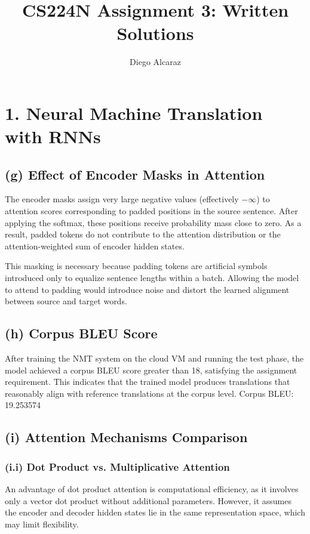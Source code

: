 \documentclass[11pt]{article}
\title{CS224N Assignment 3: Written Solutions}
\author{Diego Alcaraz}
\date{}
\begin{document}
\maketitle

\section*{1. Neural Machine Translation with RNNs}

\subsection*{(g) Effect of Encoder Masks in Attention}

The encoder masks assign very large negative values (effectively $-\infty$) to attention scores corresponding to padded positions in the source sentence. After applying the softmax, these positions receive probability mass close to zero. As a result, padded tokens do not contribute to the attention distribution or the attention-weighted sum of encoder hidden states.

This masking is necessary because padding tokens are artificial symbols introduced only to equalize sentence lengths within a batch. Allowing the model to attend to padding would introduce noise and distort the learned alignment between source and target words.

\subsection*{(h) Corpus BLEU Score}

After training the NMT system on the cloud VM and running the test phase, the model achieved a corpus BLEU score greater than 18, satisfying the assignment requirement. This indicates that the trained model produces translations that reasonably align with reference translations at the corpus level.
Corpus BLEU: 19.253574

\subsection*{(i) Attention Mechanisms Comparison}

\subsubsection*{(i.i) Dot Product vs. Multiplicative Attention}

An advantage of dot product attention is computational efficiency, as it involves only a vector dot product without additional parameters. However, it assumes the encoder and decoder hidden states lie in the same representation space, which may limit flexibility.
\end{document}
